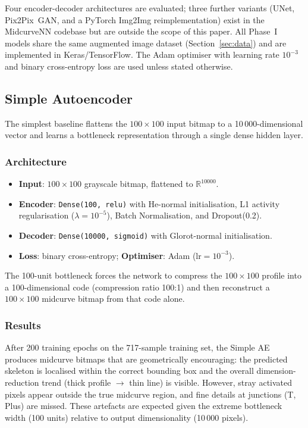 \documentclass[journal]{IEEEtran}
\begin{document}
Four encoder-decoder architectures are evaluated; three further variants
(UNet, Pix2Pix~GAN, and a PyTorch Img2Img reimplementation) exist in the
MidcurveNN codebase but are outside the scope of this paper.  All Phase~I
models share the same augmented image dataset (Section~\ref{sec:data}) and
are implemented in Keras/TensorFlow.  The Adam optimiser with learning rate
$10^{-3}$ and binary cross-entropy loss are used unless stated otherwise.

\subsection{Simple Autoencoder}
\label{sec:simple_ae}

The simplest baseline flattens the $100 \times 100$ input bitmap to a
10\,000-dimensional vector and learns a bottleneck representation through a
single dense hidden layer.

\subsubsection{Architecture}

\begin{itemize}
  \item \textbf{Input}: $100 \times 100$ grayscale bitmap, flattened to
        $\mathbb{R}^{10000}$.
  \item \textbf{Encoder}: \texttt{Dense(100, relu)} with He-normal
        initialisation, L1 activity regularisation ($\lambda = 10^{-5}$),
        Batch Normalisation, and Dropout(0.2).
  \item \textbf{Decoder}: \texttt{Dense(10000, sigmoid)} with Glorot-normal
        initialisation.
  \item \textbf{Loss}: binary cross-entropy; \textbf{Optimiser}: Adam
        ($\text{lr}=10^{-3}$).
\end{itemize}

The 100-unit bottleneck forces the network to compress the $100 \times 100$
profile into a 100-dimensional code (compression ratio 100:1) and then
reconstruct a $100 \times 100$ midcurve bitmap from that code alone.

\subsubsection{Results}

After 200 training epochs on the 717-sample training set, the Simple AE
produces midcurve bitmaps that are geometrically encouraging: the predicted
skeleton is localised within the correct bounding box and the overall
dimension-reduction trend (thick profile $\to$ thin line) is visible.
However, stray activated pixels appear outside the true midcurve region, and
fine details at junctions (T, Plus) are missed.  These artefacts are expected
given the extreme bottleneck width (100 units) relative to output dimensionality
(10\,000 pixels).
\end{document}
